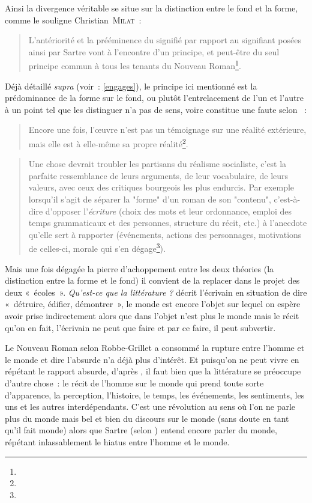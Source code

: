\documentclass[12pt, a4paper]{article}
\begin{document}
   


Ainsi la divergence véritable se situe sur la distinction entre le fond et la forme, comme le souligne Christian~\textsc{Milat}~:
\begin{quote}
    L'antériorité et la prééminence du signifié par rapport au signifiant posées ainsi par Sartre vont à l'encontre d'un principe, et peut-être du seul principe commun à tous les tenants du Nouveau Roman\footnote{}.
\end{quote}
Déjà détaillé \textit{supra} (voir~: \ref{engages}), le principe ici mentionné est la prédominance de la forme sur le fond, ou plutôt l'entrelacement de l'un et l'autre à un point tel que les distinguer n'a pas de sens, voire constitue une faute selon \robbe~:
\begin{quote}
    Encore une fois, l'œuvre n'est pas un témoignage sur une réalité extérieure, mais elle est à elle-même sa propre réalité\footnote{}.
\end{quote}
\begin{quote}
    Une chose devrait troubler les partisans du réalisme socialiste, c'est la parfaite ressemblance de leurs arguments, de leur vocabulaire, de leurs valeurs, avec ceux des critiques bourgeois les plus endurcis. Par exemple lorsqu'il s'agit de séparer la "forme" d'un roman de son "contenu", c'est-à-dire d'opposer l'\textit{écriture} (choix des mots et leur ordonnance, emploi des temps grammaticaux et des personnes, structure du récit, etc.) à l'anecdote qu'elle sert à rapporter (événements, actions des personnages, motivations de celles-ci, morale qui s'en dégage\footnote{}).
\end{quote}


Mais une fois dégagée la pierre d'achoppement entre les deux théories (la distinction entre la forme et le fond) il convient de la replacer dans le projet des deux «~écoles~». \textit{Qu'est-ce que la littérature ?} décrit l'écrivain en situation de dire «~détruire, édifier, démontrer~», le monde est encore l'objet sur lequel on espère avoir prise indirectement alors que dans \punr{} l'objet n'est plus le monde mais le récit qu'on en fait, l'écrivain ne peut que faire et par ce faire, il peut subvertir. 

Le Nouveau Roman selon Robbe-Grillet a consommé la rupture entre l'homme et le monde et dire l'absurde n'a déjà plus d'intérêt. Et puisqu'on ne peut vivre en répétant le rapport absurde, d'après \robbe{}, il faut bien que la littérature se préoccupe d'autre chose~: le récit de l'homme sur le monde qui prend toute sorte d'apparence, la perception, l'histoire, le temps, les événements, les sentiments, les uns et les autres interdépendants. C'est une révolution au sens où l'on ne parle plus du monde mais bel et bien du discours sur le monde (sans doute en tant qu'il fait monde) alors que Sartre (selon \punr) entend encore parler du monde, répétant inlassablement le hiatus entre l'homme et le monde.
\end{document}
